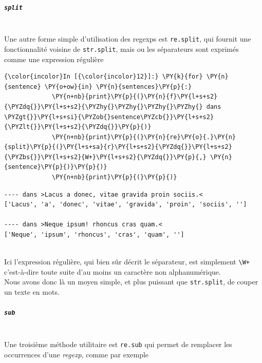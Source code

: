     \hypertarget{split}{%
\subparagraph{\texorpdfstring{\texttt{split}}{split}\\\\}\label{split}}

    Une autre forme simple d'utilisation des regexps est \texttt{re.split},
qui fournit une fonctionnalité voisine de \texttt{str.split}, mais ou
les séparateurs sont exprimés comme une expression régulière

    \begin{Verbatim}[commandchars=\\\{\}]
{\color{incolor}In [{\color{incolor}12}]:} \PY{k}{for} \PY{n}{sentence} \PY{o+ow}{in} \PY{n}{sentences}\PY{p}{:}
             \PY{n+nb}{print}\PY{p}{(}\PY{n}{f}\PY{l+s+s2}{\PYZdq{}}\PY{l+s+s2}{\PYZhy{}\PYZhy{}\PYZhy{}\PYZhy{} dans \PYZgt{}}\PY{l+s+si}{\PYZob{}sentence\PYZcb{}}\PY{l+s+s2}{\PYZlt{}}\PY{l+s+s2}{\PYZdq{}}\PY{p}{)}
             \PY{n+nb}{print}\PY{p}{(}\PY{n}{re}\PY{o}{.}\PY{n}{split}\PY{p}{(}\PY{l+s+sa}{r}\PY{l+s+s2}{\PYZdq{}}\PY{l+s+s2}{\PYZbs{}}\PY{l+s+s2}{W+}\PY{l+s+s2}{\PYZdq{}}\PY{p}{,} \PY{n}{sentence}\PY{p}{)}\PY{p}{)}
             \PY{n+nb}{print}\PY{p}{(}\PY{p}{)}
\end{Verbatim}


    \begin{Verbatim}[commandchars=\\\{\}]
---- dans >Lacus a donec, vitae gravida proin sociis.<
['Lacus', 'a', 'donec', 'vitae', 'gravida', 'proin', 'sociis', '']

---- dans >Neque ipsum! rhoncus cras quam.<
['Neque', 'ipsum', 'rhoncus', 'cras', 'quam', '']


    \end{Verbatim}

    Ici l'expression régulière, qui bien sûr décrit le séparateur, est
simplement \texttt{\textbackslash{}W+} c'est-à-dire toute suite d'au
moins un caractère non alphanumérique.\\

Nous avons donc là un moyen simple, et plus puissant que
\texttt{str.split}, de couper un texte en mots.

    \hypertarget{sub}{%
\subparagraph{\texorpdfstring{\texttt{sub}}{sub}\\\\}\label{sub}}

    Une troisième méthode utilitaire est \texttt{re.sub} qui permet de
remplacer les occurrences d'une \emph{regexp}, comme par exemple

